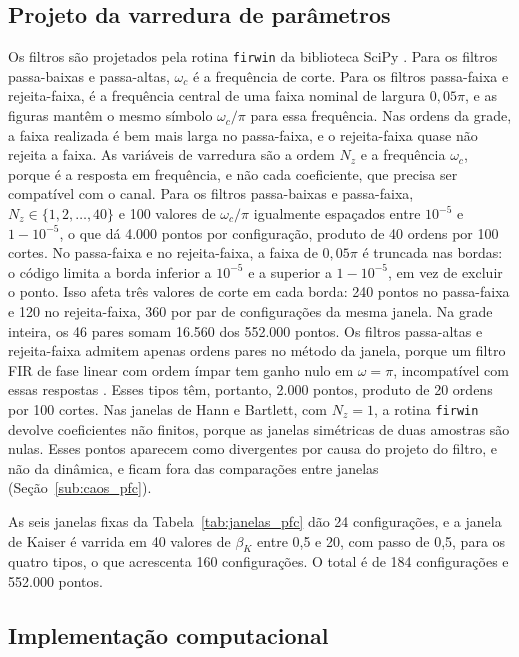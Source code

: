\documentclass{pfccefsa}
\begin{document}
\subsection{Projeto da varredura de parâmetros}
\label{sub:varredura}

Os filtros são projetados pela rotina \texttt{firwin} da biblioteca SciPy
\cite{Virtanen2020}. Para os filtros passa-baixas e passa-altas, $\omega_c$ é a frequência de corte.
Para os filtros passa-faixa e rejeita-faixa, é a frequência central de uma faixa
nominal de largura $0{,}05\pi$, e as figuras mantêm o mesmo símbolo
$\omega_c/\pi$ para essa frequência. Nas ordens da grade, a faixa realizada é
bem mais larga no passa-faixa, e o rejeita-faixa quase não rejeita a faixa. As
variáveis de varredura são a ordem
$N_z$ e a frequência $\omega_c$, porque é a resposta em frequência, e
não cada coeficiente, que precisa ser compatível com o canal. Para os filtros
passa-baixas e passa-faixa, $N_z\in\{1,2,\ldots,40\}$ e 100 valores de
$\omega_c/\pi$ igualmente espaçados entre $10^{-5}$ e $1-10^{-5}$, o que dá 4.000
pontos por configuração, produto de 40 ordens por 100 cortes. No passa-faixa e
no rejeita-faixa, a faixa de $0{,}05\pi$ é truncada nas bordas: o código limita a
borda inferior a $10^{-5}$ e a superior a $1-10^{-5}$, em vez de excluir o ponto.
Isso afeta três valores de corte em cada borda: 240 pontos no passa-faixa e 120
no rejeita-faixa, 360 por par de configurações da mesma janela.
Na grade inteira, os 46 pares somam 16.560 dos 552.000 pontos. Os filtros
passa-altas e rejeita-faixa admitem apenas ordens pares no método da janela,
porque um filtro FIR de fase linear com ordem ímpar tem ganho nulo em
$\omega=\pi$, incompatível com essas respostas \cite{Oppenheim2009}. Esses
tipos têm, portanto, 2.000 pontos, produto de 20 ordens por 100 cortes. Nas
janelas de Hann e Bartlett, com $N_z=1$, a rotina \texttt{firwin} devolve
coeficientes não finitos, porque as janelas simétricas de duas amostras são nulas.
Esses pontos aparecem como divergentes por causa do projeto do filtro, e não da
dinâmica, e ficam fora das comparações entre janelas (Seção~\ref{sub:caos_pfc}).

As seis janelas fixas da Tabela~\ref{tab:janelas_pfc} dão 24 configurações, e a
janela de Kaiser é varrida em 40 valores de $\beta_K$ entre 0,5 e 20, com passo
de 0,5, para os quatro tipos, o que acrescenta 160 configurações. O total é de
184 configurações e 552.000 pontos.

\subsection{Implementação computacional}
\label{sub:implementacao}
\end{document}
